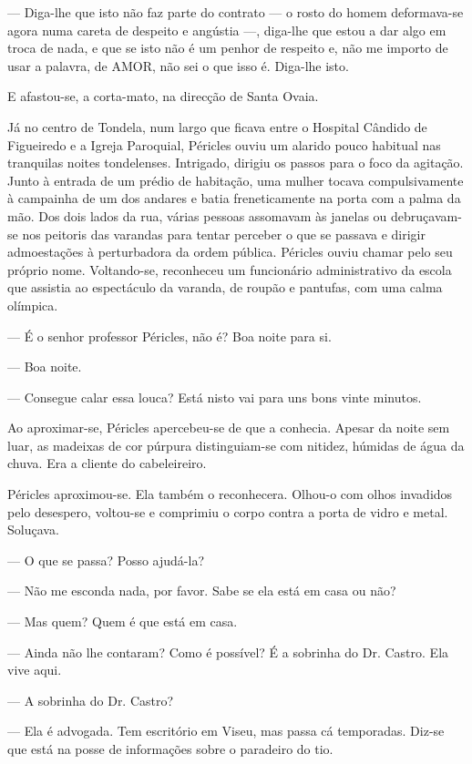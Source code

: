 --- Diga-lhe que isto não faz parte do contrato --- o rosto do homem
  deformava-se agora numa careta de despeito e angústia ---, diga-lhe
  que estou a dar algo em troca de nada, e que se isto não é um penhor
  de respeito e, não me importo de usar a palavra, de AMOR, não sei o
  que isso é. Diga-lhe isto.

E afastou-se, a corta-mato, na direcção de Santa Ovaia.

Já no centro de Tondela, num largo que ficava entre o
Hospital Cândido de Figueiredo e a Igreja Paroquial, Péricles ouviu um
alarido pouco habitual nas tranquilas noites tondelenses. Intrigado,
dirigiu os passos para o foco da agitação. Junto à entrada de um prédio
de habitação, uma mulher tocava compulsivamente à campainha de um dos
andares e batia freneticamente na porta com a palma da mão. Dos dois
lados da rua, várias pessoas assomavam às janelas ou debruçavam-se nos
peitoris das varandas para tentar perceber o que se passava e dirigir
admoestações à perturbadora da ordem pública. Péricles ouviu chamar
pelo seu próprio nome. Voltando-se, reconheceu um funcionário
administrativo da escola que assistia ao espectáculo da varanda, de
roupão e pantufas, com uma calma olímpica.

--- É o senhor professor Péricles, não é? Boa noite para si.

--- Boa noite.

--- Consegue calar essa louca? Está nisto vai para uns bons vinte minutos.

Ao aproximar-se, Péricles apercebeu-se de que a conhecia. Apesar da
noite sem luar, as madeixas de cor púrpura distinguiam-se
com nitidez, húmidas de água da chuva. Era a cliente do
cabeleireiro.

Péricles aproximou-se. Ela também o reconhecera. Olhou-o com olhos invadidos pelo desespero, voltou-se e comprimiu o corpo
contra a porta de vidro e metal. Soluçava.

--- O que se passa? Posso ajudá-la?

--- Não me esconda nada, por favor. Sabe se ela está em casa ou não?

--- Mas quem? Quem é que está em casa.

--- Ainda não lhe contaram? Como é possível? É a sobrinha do Dr. Castro.
  Ela vive aqui.

--- A sobrinha do Dr. Castro?

--- Ela é advogada. Tem escritório em Viseu, mas passa cá temporadas.
  Diz-se que está na posse de informações sobre o paradeiro do tio.


